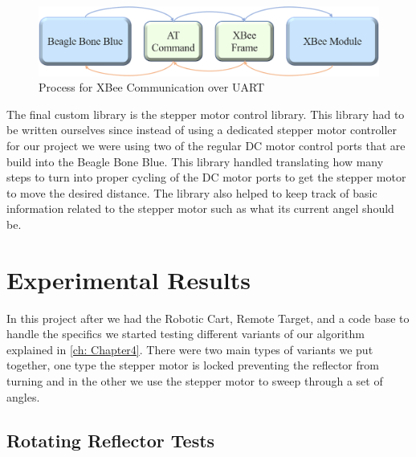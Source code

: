 \begin{figure} [b]
  \centering
  \includegraphics[width=\textwidth]{figs/img/Command Process Diagram.png}
  \caption{Process for XBee Communication over UART}
  \label{fig:CommandProcessDiagram}
\end{figure}

The final custom library is the stepper motor control library.  This library had to be written ourselves since instead of using a dedicated stepper motor controller for our project we were using two of the regular DC motor control ports that are build into the Beagle Bone Blue.  This library handled translating how many steps to turn into proper cycling of the DC motor ports to get the stepper motor to move the desired distance.  The library also helped to keep track of basic information related to the stepper motor such as what its current angel should be.

\section{Experimental Results}
\label{sec:Experimental Results}

In this project after we had the Robotic Cart, Remote Target, and a code base to handle the specifics we started testing different variants of our algorithm explained in \autoref{ch: Chapter4}. There were two main types of variants we put together, one type the stepper motor is locked preventing the reflector from turning and in the other we use the stepper motor to sweep through a set of angles.

\subsection{Rotating Reflector Tests}

